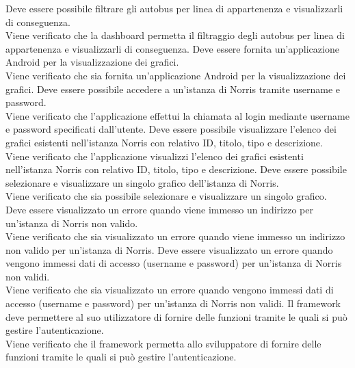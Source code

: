  Deve essere possibile filtrare gli autobus per linea di appartenenza e visualizzarli di conseguenza.\\
Viene verificato che la dashboard permetta il filtraggio degli autobus per linea di appartenenza e visualizzarli di conseguenza.
 Deve essere fornita un'applicazione Android per la visualizzazione dei grafici.\\
Viene verificato che sia fornita un'applicazione Android per la visualizzazione dei grafici.
 Deve essere possibile accedere a un'istanza di Norris tramite username e password.\\
Viene verificato che l'applicazione effettui la chiamata al login mediante username e password specificati dall'utente.
 Deve essere possibile visualizzare l'elenco dei grafici esistenti nell'istanza Norris con relativo ID, titolo, tipo e descrizione.\\
Viene verificato che l'applicazione visualizzi l'elenco dei grafici esistenti nell'istanza Norris con relativo ID, titolo, tipo e descrizione.
 Deve essere possibile selezionare e visualizzare un singolo grafico dell'istanza di Norris.\\
Viene verificato che sia possibile selezionare e visualizzare un singolo grafico.
 Deve essere visualizzato un errore quando viene immesso un indirizzo per un'istanza di Norris non valido.\\
Viene verificato che sia visualizzato un errore quando viene immesso un indirizzo non valido per un'istanza di Norris.
 Deve essere visualizzato un errore quando vengono immessi dati di accesso (username e password) per un'istanza di Norris non validi.\\
Viene verificato che sia visualizzato un errore quando vengono immessi dati di accesso (username e password) per un'istanza di Norris non validi.
 Il framework deve permettere al suo utilizzatore di fornire delle funzioni tramite le quali si può gestire l'autenticazione.\\
Viene verificato che il framework permetta allo sviluppatore di fornire delle funzioni tramite le quali si può gestire l'autenticazione.
